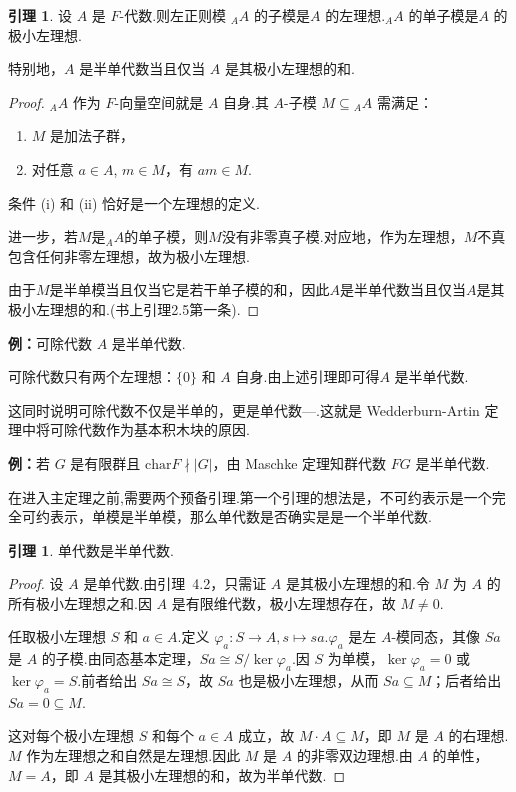 \documentclass[11pt,a4paper]{article}
\theoremstyle{plain}
\theoremstyle{definition}
\newtheorem{lem}[thm]{引理}
\begin{document}
\begin{lem}
设 $A$ 是 $F$-代数.则左正则模 ${}_A A$ 的子模是$A$ 的左理想.${}_A A$ 的单子模是$A$ 的极小左理想. \par
特别地，$A$ 是半单代数当且仅当 $A$ 是其极小左理想的和.
\end{lem}
\begin{proof}
${}_A A$ 作为 $F$-向量空间就是 $A$ 自身.其 $A$-子模 $M \subseteq {}_A A$ 需满足：
\begin{enumerate}
    \item $M$ 是加法子群，
    \item 对任意 $a \in A$, $m \in M$，有 $a m \in M$.
\end{enumerate}
条件 (i) 和 (ii) 恰好是一个左理想的定义.\par
进一步，若$M$是${}_A A$的单子模，则$M$没有非零真子模.对应地，作为左理想，$M$不真包含任何非零左理想，故为极小左理想.\par
由于$M$是半单模当且仅当它是若干单子模的和，因此$A$是半单代数当且仅当$A$是其极小左理想的和.(书上引理2.5第一条).
\end{proof}

\noindent\textbf{例：}可除代数 $A$ 是半单代数.

可除代数只有两个左理想：$\{0\}$ 和 $A$ 自身.由上述引理即可得$A$ 是半单代数.\par
这同时说明可除代数不仅是半单的，更是单代数—.这就是 Wedderburn-Artin 定理中将可除代数作为基本积木块的原因.


\noindent\textbf{例：}若 $G$ 是有限群且 $\mathrm{char}F \nmid |G|$，由 Maschke 定理知群代数 $FG$ 是半单代数.


\bigskip
在进入主定理之前,需要两个预备引理.第一个引理的想法是，不可约表示是一个完全可约表示，单模是半单模，那么单代数是否确实是是一个半单代数.

\begin{lem}
单代数是半单代数.
\end{lem}

\begin{proof}
设 $A$ 是单代数.由引理~4.2，只需证 $A$ 是其极小左理想的和.令 $M$ 为 $A$ 的所有极小左理想之和.因 $A$ 是有限维代数，极小左理想存在，故 $M \neq 0$.

任取极小左理想 $S$ 和 $a \in A$.定义 $\varphi_a: S \to A, s \mapsto sa$.$\varphi_a$ 是左 $A$-模同态，其像 $Sa$ 是 $A$ 的子模.由同态基本定理，$Sa \cong S / \ker\varphi_a$.因 $S$ 为单模，$\ker\varphi_a = 0$ 或 $\ker\varphi_a = S$.前者给出 $Sa \cong S$，故 $Sa$ 也是极小左理想，从而 $Sa \subseteq M$；后者给出 $Sa = 0 \subseteq M$.

这对每个极小左理想 $S$ 和每个 $a \in A$ 成立，故 $M \cdot A \subseteq M$，即 $M$ 是 $A$ 的右理想.$M$ 作为左理想之和自然是左理想.因此 $M$ 是 $A$ 的非零双边理想.由 $A$ 的单性，$M = A$，即 $A$ 是其极小左理想的和，故为半单代数.
\end{proof}
\end{document}
